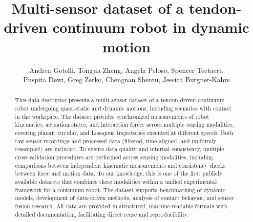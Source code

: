 \documentclass[14pt, a4paper]{article}
\title{Multi-sensor dataset of a tendon-driven continuum robot in dynamic motion}
\author{Andrea Gotelli, Tongjia Zheng, Angela Peloso, Spencer Teetaert, \\Puspita Dewi, Greg Zetko, Chengnan Shentu, Jessica Burgner-Kahrs}
\begin{document}
\maketitle


\begin{abstract}


    This data descriptor presents a multi-sensor dataset of a tendon-driven continuum robot undergoing quasi-static and dynamic motions, including scenarios with contact in the workspace. The dataset provides synchronized measurements of robot kinematics, actuation states, and interaction forces across multiple sensing modalities, covering planar, circular, and Lissajous trajectories executed at different speeds. Both raw sensor recordings and processed data (filtered, time-aligned, and uniformly resampled) are included.
    To ensure data quality and internal consistency, multiple cross-validation procedures are performed across sensing modalities, including comparisons between independent kinematic measurements and consistency checks between force and motion data. To our knowledge, this is one of the first publicly available datasets that combines these modalities within a unified experimental framework for a continuum robot. The dataset supports benchmarking of dynamic models, development of data-driven methods, analysis of contact behavior, and sensor fusion research. All data are provided in structured, machine-readable formats with detailed documentation, facilitating direct reuse and reproducibility.
\end{abstract}
\end{document}
